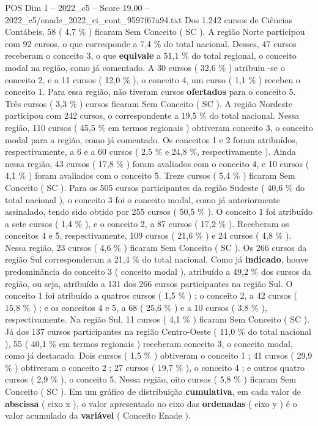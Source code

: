 \begin{textsample}{POS Dim 1 – 2022\_c5 – Score 19.00 – 2022\_c5/enade\_2022\_ci\_cont\_9597f67a94.txt}
Dos 1.242 cursos de Ciências Contábeis, 58 ( 4,7 \% ) ficaram Sem Conceito ( SC ).
A região Norte participou com 92 cursos, o que corresponde a 7,4 \% do total nacional.
Desses, 47 cursos receberam o conceito 3, o que \textbf{equivale} a 51,1 \% do total regional, o conceito modal na região, como já comentado.
A 30 cursos ( 32,6 \% ) atribuiu -se o conceito 2, e a 11 cursos ( 12,0 \% ), o conceito 4, um curso ( 1,1 \% ) recebeu o conceito 1.
Para essa região, não tiveram cursos \textbf{ofertados} para o conceito 5.
Três cursos ( 3,3 \% ) cursos ficaram Sem Conceito ( SC ).
A região Nordeste participou com 242 cursos, o correspondente a 19,5 \% do total nacional.
Nessa região, 110 cursos ( 45,5 \% em termos regionais ) obtiveram conceito 3, o conceito modal para a região, como já comentado.
Os conceitos 1 e 2 foram atribuídos, respectivamente, a 6 e a 60 cursos ( 2,5 \% e 24,8 \%, respectivamente ).
Ainda nessa região, 43 cursos ( 17,8 \% ) foram avaliados com o conceito 4, e 10 cursos ( 4,1 \% ) foram avaliados com o conceito 5.
Treze cursos ( 5,4 \% ) ficaram Sem Conceito ( SC ).
Para os 505 cursos participantes da região Sudeste ( 40,6 \% do total nacional ), o conceito 3 foi o conceito modal, como já anteriormente assinalado, tendo sido obtido por 255 cursos ( 50,5 \% ).
O conceito 1 foi atribuído a sete cursos ( 1,4 \% ), e o conceito 2, a 87 cursos ( 17,2 \% ).
Receberam os conceitos 4 e 5, respectivamente, 109 cursos ( 21,6 \% ) e 24 cursos ( 4,8 \% ).
Nessa região, 23 cursos ( 4,6 \% ) ficaram Sem Conceito ( SC ).
Os 266 cursos da região Sul corresponderam a 21,4 \% do total nacional.
Como já \textbf{indicado}, houve predominância do conceito 3 ( conceito modal ), atribuído a 49,2 \% dos cursos da região, ou seja, atribuído a 131 dos 266 cursos participantes na região Sul.
O conceito 1 foi atribuído a quatros cursos ( 1,5 \% ) ; o conceito 2, a 42 cursos ( 15,8 \% ) ; e os conceitos 4 e 5, a 68 ( 25,6 \% ) e a 10 cursos ( 3,8 \% ), respectivamente.
Na região Sul, 11 cursos ( 4,1 \% ) ficaram Sem Conceito ( SC ).
Já dos 137 cursos participantes na região Centro-Oeste ( 11,0 \% do total nacional ), 55 ( 40,1 \% em termos regionais ) receberam conceito 3, o conceito modal, como já destacado.
Dois cursos ( 1,5 \% ) obtiveram o conceito 1 ; 41 cursos ( 29,9 \% ) obtiveram o conceito 2 ; 27 cursos ( 19,7 \% ), o conceito 4 ; e outros quatro cursos ( 2,9 \% ), o conceito 5.
Nessa região, oito cursos ( 5,8 \% ) ficaram Sem Conceito ( SC ).
Em um gráfico de distribuição \textbf{cumulativa}, em cada valor de \textbf{abscissa} ( eixo x ), o valor apresentado no eixo das \textbf{ordenadas} ( eixo y ) é o valor acumulado da \textbf{variável} ( Conceito Enade ).

\end{textsample}
